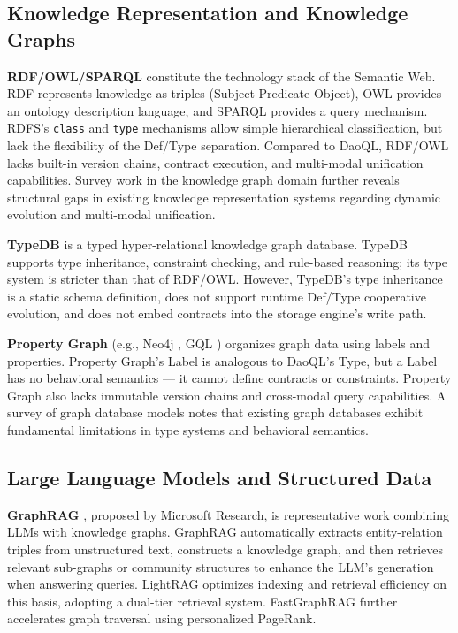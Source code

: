 \documentclass[11pt,a4paper]{article}
\begin{document}
\subsection{Knowledge Representation and Knowledge
Graphs}\label{knowledge-representation-and-knowledge-graphs}

\textbf{RDF/OWL/SPARQL} \cite{w3c-rdf2014,w3c-owl2012,w3c-sparql2013} constitute the technology stack
of the Semantic Web. RDF represents knowledge as triples
(Subject-Predicate-Object), OWL provides an ontology description
language, and SPARQL provides a query mechanism. RDFS's \texttt{class}
and \texttt{type} mechanisms allow simple hierarchical classification,
but lack the flexibility of the Def/Type separation. Compared to DaoQL,
RDF/OWL lacks built-in version chains, contract execution, and
multi-modal unification capabilities. Survey work in the knowledge graph
domain \cite{hogan2021} further reveals structural gaps in existing knowledge
representation systems regarding dynamic evolution and multi-modal
unification.

\textbf{TypeDB} \cite{ioannou2023} is a typed hyper-relational knowledge graph
database. TypeDB supports type inheritance, constraint checking, and
rule-based reasoning; its type system is stricter than that of RDF/OWL.
However, TypeDB's type inheritance is a static schema definition, does
not support runtime Def/Type cooperative evolution, and does not embed
contracts into the storage engine's write path.

\textbf{Property Graph} (e.g., Neo4j \cite{webber2015}, GQL \cite{francis2024}) organizes
graph data using labels and properties. Property Graph's Label is
analogous to DaoQL's Type, but a Label has no behavioral semantics ---
it cannot define contracts or constraints. Property Graph also lacks
immutable version chains and cross-modal query capabilities. A survey of
graph database models \cite{angles2008} notes that existing graph databases
exhibit fundamental limitations in type systems and behavioral
semantics.

\subsection{Large Language Models and Structured
Data}\label{large-language-models-and-structured-data}

\textbf{GraphRAG} \cite{edge2024}, proposed by Microsoft Research, is
representative work combining LLMs with knowledge graphs. GraphRAG
automatically extracts entity-relation triples from unstructured text,
constructs a knowledge graph, and then retrieves relevant sub-graphs or
community structures to enhance the LLM's generation when answering
queries. LightRAG \cite{guo2024} optimizes indexing and retrieval efficiency
on this basis, adopting a dual-tier retrieval system. FastGraphRAG
\cite{fastgraphrag2024} further accelerates graph traversal using personalized
PageRank.
\end{document}
